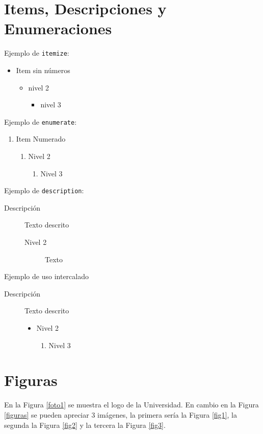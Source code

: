 \section{Items, Descripciones y Enumeraciones}
Ejemplo de \texttt{itemize}:

  \begin{itemize}
  \item Item sin números
    \begin{itemize}
  \item nivel 2
    \begin{itemize}
    \item nivel 3
    \end{itemize}
  \end{itemize}
\end{itemize}

Ejemplo de \texttt{enumerate}:
\begin{enumerate}
  \item Item Numerado
    \begin{enumerate}
     \item Nivel 2
    \begin{enumerate}
      \item Nivel 3
    \end{enumerate}
  \end{enumerate}
\end{enumerate}

Ejemplo de \texttt{description}:
\begin{description}
  \item[Descripción] Texto descrito
  \begin{description}
  \item[Nivel 2] Texto
\end{description}
\end{description}

Ejemplo de uso intercalado

\begin{description}
  \item[Descripción] Texto descrito
  \begin{itemize}
  \item Nivel 2
  \begin{enumerate}
      \item Nivel 3
    \end{enumerate}
\end{itemize}
\end{description}



\section{Figuras}
En la Figura \ref{foto1} se muestra el logo de la Universidad. En cambio en la Figura \ref{figuras} se pueden apreciar 3 imágenes, la primera sería la Figura \ref{fig1}, la segunda la Figura \ref{fig2} y la tercera la Figura \ref{fig3}.


